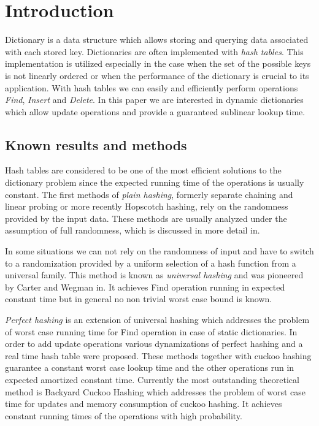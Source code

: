 \section{Introduction}
Dictionary is a data structure which allows storing and querying data associated with each stored key. 
Dictionaries are often implemented with \emph{hash tables}. 
This implementation is utilized especially in the case when the set of the possible keys is not linearly ordered or when the performance of the dictionary is crucial to its application.
With hash tables we can easily and efficiently perform operations \emph{Find}, \emph{Insert} and \emph{Delete}.
In this paper we are interested in dynamic dictionaries which allow update operations and provide a guaranteed sublinear lookup time.

\subsection{Known results and methods}
Hash tables are considered to be one of the most efficient solutions to the dictionary problem since the expected running time of the operations is usually constant.
The first methods of \emph{plain hashing}, formerly separate chaining and linear probing or more recently Hopscotch hashing\cite{DBLP:conf/wdag/HerlihyST08}, rely on the randomness provided by the input data. 
These methods are usually analyzed under the assumption of full randomness, which is discussed in more detail in\cite{DBLP:books/sp/Mehlhorn84}.

In some situations we can not rely on the randomness of input and have to switch to a randomization provided by a uniform selection of a hash function from a universal family.
This method is known as \emph{universal hashing} and was pioneered by Carter and Wegman in\cite{DBLP:journals/jcss/CarterW79}.
It achieves Find operation running in expected constant time but in general no non trivial worst case bound is known.

\emph{Perfect hashing}\cite{Fredman:1984:SST:828.1884} is an extension of universal hashing which addresses the problem of worst case running time for Find operation in case of static dictionaries. 
In order to add update operations various dynamizations of perfect hashing\cite{DBLP:journals/siamcomp/DietzfelbingerKMHRT94} and a real time hash table\cite{DBLP:conf/icalp/DietzfelbingerH90} were proposed. 
These methods together with cuckoo hashing\cite{DBLP:conf/esa/PaghR01} guarantee a constant worst case lookup time and the other operations run in expected amortized constant time.
Currently the most outstanding theoretical method is Backyard Cuckoo Hashing\cite{DBLP:conf/focs/ArbitmanNS10} which addresses the problem of worst case time for updates and memory consumption of cuckoo hashing.
It achieves constant running times of the operations with high probability.

